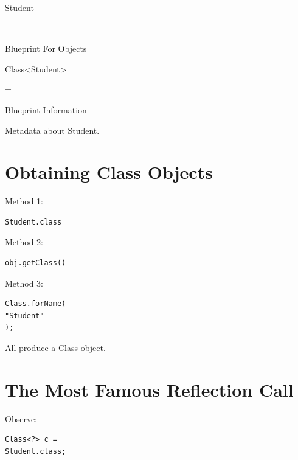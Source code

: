\documentclass[11pt,a4paper]{book}
\begin{document}
Student

=

Blueprint For Objects


Class<Student>

=

Blueprint Information


Metadata about Student.


\section{Obtaining Class Objects}

Method 1:

\begin{verbatim} 
Student.class
\end{verbatim}


Method 2:

\begin{verbatim} 
obj.getClass()
\end{verbatim}


Method 3:

\begin{verbatim} 
Class.forName(
"Student"
);
\end{verbatim}


All produce a Class object.


\section{The Most Famous Reflection Call}

Observe:

\begin{verbatim} 
Class<?> c =
Student.class;
\end{verbatim}
\end{document}
